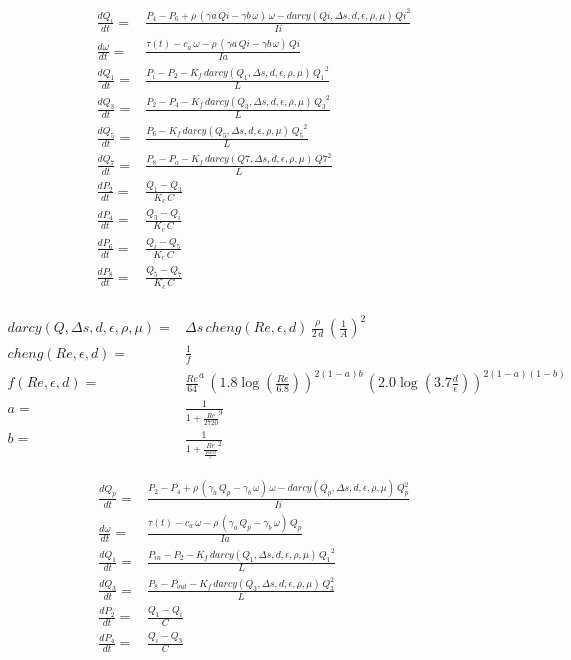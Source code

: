 \begin{align}
  \frac{dQ_i}{dt} = & \frac{P_4 - P_6 + \rho \, (\gamma a \, Qi - \gamma b \,\omega) \,\omega - darcy(Qi, \Delta s, d, \epsilon, \rho, \mu) \, Qi^2}{Ii}\\
  \frac{d\omega}{dt} = & \frac{\tau(t) - c_a \,\omega - \rho \, (\gamma a \, Qi - \gamma b \,\omega) \, Qi}{Ia} \\
  \frac{dQ_1}{dt} = & \frac{P_i - P_2 - K_f \, darcy(Q_1, \Delta s, d, \epsilon, \rho, \mu) \, {Q_1}^2}{L}\\
  \frac{dQ_3}{dt} = & \frac{P_2 - P_4 - K_f \, darcy(Q_3, \Delta s, d, \epsilon, \rho, \mu) \, {Q_3}^2}{L} \\
  \frac{dQ_5}{dt} = & \frac{P_6 - K_f \, darcy(Q_5, \Delta s, d, \epsilon, \rho, \mu) \, {Q_5}^2}{L} \\
  \frac{dQ_7}{dt} = & \frac{P_8 - P_o - K_f \, darcy(Q7, \Delta s, d, \epsilon, \rho, \mu) \, Q7^2}{L} \\
  \frac{dP_2}{dt} = & \frac{Q_1 - Q_3}{K_c \, C} \\
  \frac{dP_4}{dt} = & \frac{Q_3 - Q_i}{K_c \, C} \\
  \frac{dP_6}{dt} = & \frac{Q_i - Q_5}{K_c \, C} \\
  \frac{dP_8}{dt} = & \frac{Q_5 - Q_7}{K_c \, C}  \\
\end{align}


\begin{align}
  darcy(Q, \Delta s, d, \epsilon, \rho, \mu) = & \Delta s \, cheng(Re, \epsilon, d) \, \frac{\rho}{2 \, d} \, \left (\frac{1}{A} \right )^2 \\
  cheng(Re, \epsilon, d)  = & \frac{1}{f}\\
  f(Re, \epsilon, d) = & {\frac{Re}{64}}^a \, {\left (1.8 \log\left (\frac{Re}{6.8} \right ) \right )} ^{2 (1 - a) b} \, {\left ( 2.0 \log \left (3.7 \frac{d}{\epsilon} \right ) \right )}^{2 (1 - a)(1 - b)} \\
  a = & \frac{1}{1 + {\frac{Re}{2720}}^9}\\
  b = & \frac{1}{1 + {\frac{Re}{\frac{160\,d}{\epsilon}}}^2}
\end{align}


\begin{align}
  \frac{dQ_{p}}{dt} = & \frac{P_2 - P_4 + \rho \, (\gamma_a \, Q_{p} - \gamma_b \,\omega) \,\omega - darcy(Q_{p}, \Delta s, d, \epsilon, \rho, \mu) \, Q_{p}^2}{Ii}\\
  \frac{d\omega}{dt} = & \frac{\tau(t) - c_a \,\omega - \rho \, (\gamma_a \, Q_{p} - \gamma_b \,\omega) \, Q_{p}}{Ia} \\
  \frac{dQ_1}{dt} = & \frac{P_{in} - P_2 - K_f \, darcy(Q_1, \Delta s, d, \epsilon, \rho, \mu) \, {Q_1}^2}{L}\\
  \frac{dQ_3}{dt} = & \frac{P_8 - P_{out} - K_f \, darcy(Q_3, \Delta s, d, \epsilon, \rho, \mu) \, Q_3^2}{L} \\
  \frac{dP_2}{dt} = & \frac{Q_1 - Q_{i}}{C} \\
  \frac{dP_4}{dt} = & \frac{Q_{i} - Q_3}{C} \\
\end{align}

